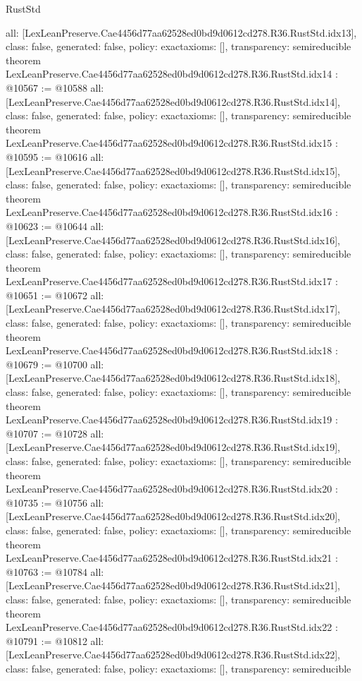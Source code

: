 \begin{lexlean}{RustStd}
\begin{coremodule}
{  all: [LexLeanPreserve.Cae4456d77aa62528ed0bd9d0612cd278.R36.RustStd.idx13],
  class: false,
  generated: false,
  policy: exact{axioms: []},
  transparency: semireducible
}
theorem LexLeanPreserve.Cae4456d77aa62528ed0bd9d0612cd278.R36.RustStd.idx14 : @10567 := @10588 {
  all: [LexLeanPreserve.Cae4456d77aa62528ed0bd9d0612cd278.R36.RustStd.idx14],
  class: false,
  generated: false,
  policy: exact{axioms: []},
  transparency: semireducible
}
theorem LexLeanPreserve.Cae4456d77aa62528ed0bd9d0612cd278.R36.RustStd.idx15 : @10595 := @10616 {
  all: [LexLeanPreserve.Cae4456d77aa62528ed0bd9d0612cd278.R36.RustStd.idx15],
  class: false,
  generated: false,
  policy: exact{axioms: []},
  transparency: semireducible
}
theorem LexLeanPreserve.Cae4456d77aa62528ed0bd9d0612cd278.R36.RustStd.idx16 : @10623 := @10644 {
  all: [LexLeanPreserve.Cae4456d77aa62528ed0bd9d0612cd278.R36.RustStd.idx16],
  class: false,
  generated: false,
  policy: exact{axioms: []},
  transparency: semireducible
}
theorem LexLeanPreserve.Cae4456d77aa62528ed0bd9d0612cd278.R36.RustStd.idx17 : @10651 := @10672 {
  all: [LexLeanPreserve.Cae4456d77aa62528ed0bd9d0612cd278.R36.RustStd.idx17],
  class: false,
  generated: false,
  policy: exact{axioms: []},
  transparency: semireducible
}
theorem LexLeanPreserve.Cae4456d77aa62528ed0bd9d0612cd278.R36.RustStd.idx18 : @10679 := @10700 {
  all: [LexLeanPreserve.Cae4456d77aa62528ed0bd9d0612cd278.R36.RustStd.idx18],
  class: false,
  generated: false,
  policy: exact{axioms: []},
  transparency: semireducible
}
theorem LexLeanPreserve.Cae4456d77aa62528ed0bd9d0612cd278.R36.RustStd.idx19 : @10707 := @10728 {
  all: [LexLeanPreserve.Cae4456d77aa62528ed0bd9d0612cd278.R36.RustStd.idx19],
  class: false,
  generated: false,
  policy: exact{axioms: []},
  transparency: semireducible
}
theorem LexLeanPreserve.Cae4456d77aa62528ed0bd9d0612cd278.R36.RustStd.idx20 : @10735 := @10756 {
  all: [LexLeanPreserve.Cae4456d77aa62528ed0bd9d0612cd278.R36.RustStd.idx20],
  class: false,
  generated: false,
  policy: exact{axioms: []},
  transparency: semireducible
}
theorem LexLeanPreserve.Cae4456d77aa62528ed0bd9d0612cd278.R36.RustStd.idx21 : @10763 := @10784 {
  all: [LexLeanPreserve.Cae4456d77aa62528ed0bd9d0612cd278.R36.RustStd.idx21],
  class: false,
  generated: false,
  policy: exact{axioms: []},
  transparency: semireducible
}
theorem LexLeanPreserve.Cae4456d77aa62528ed0bd9d0612cd278.R36.RustStd.idx22 : @10791 := @10812 {
  all: [LexLeanPreserve.Cae4456d77aa62528ed0bd9d0612cd278.R36.RustStd.idx22],
  class: false,
  generated: false,
  policy: exact{axioms: []},
  transparency: semireducible
}
\end{coremodule}
\end{lexlean}
